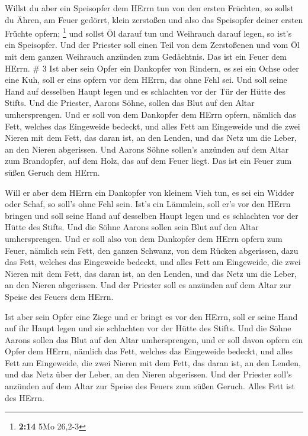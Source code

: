  Willst du aber ein Speisopfer dem HErrn tun von den ersten
Früchten, so sollst du Ähren, am Feuer gedörrt, klein zerstoßen und also
das Speisopfer deiner ersten Früchte opfern; \footnote{\textbf{2:14} 5Mo
  26,2-3}  und sollst Öl darauf tun und Weihrauch darauf
legen, so ist's ein Speisopfer.  Und der Priester soll
einen Teil von dem Zerstoßenen und vom Öl mit dem ganzen Weihrauch
anzünden zum Gedächtnis. Das ist ein Feuer dem HErrn. \# 3 
Ist aber sein Opfer ein Dankopfer von Rindern, es sei ein Ochse oder
eine Kuh, soll er eins opfern vor dem HErrn, das ohne Fehl sei.
 Und soll seine Hand auf desselben Haupt legen und es
schlachten vor der Tür der Hütte des Stifts. Und die Priester, Aarons
Söhne, sollen das Blut auf den Altar umhersprengen.  Und er
soll von dem Dankopfer dem HErrn opfern, nämlich das Fett, welches das
Eingeweide bedeckt, und alles Fett am Eingeweide  und die
zwei Nieren mit dem Fett, das daran ist, an den Lenden, und das Netz um
die Leber, an den Nieren abgerissen.  Und Aarons Söhne
sollen's anzünden auf dem Altar zum Brandopfer, auf dem Holz, das auf
dem Feuer liegt. Das ist ein Feuer zum süßen Geruch dem HErrn.

 Will er aber dem HErrn ein Dankopfer von kleinem Vieh tun,
es sei ein Widder oder Schaf, so soll's ohne Fehl sein. 
Ist's ein Lämmlein, soll er's vor den HErrn bringen  und
soll seine Hand auf desselben Haupt legen und es schlachten vor der
Hütte des Stifts. Und die Söhne Aarons sollen sein Blut auf den Altar
umhersprengen.  Und er soll also von dem Dankopfer dem HErrn
opfern zum Feuer, nämlich sein Fett, den ganzen Schwanz, von dem Rücken
abgerissen, dazu das Fett, welches das Eingeweide bedeckt, und alles
Fett am Eingeweide,  die zwei Nieren mit dem Fett, das
daran ist, an den Lenden, und das Netz um die Leber, an den Nieren
abgerissen.  Und der Priester soll es anzünden auf dem
Altar zur Speise des Feuers dem HErrn.

 Ist aber sein Opfer eine Ziege und er bringt es vor den
HErrn,  soll er seine Hand auf ihr Haupt legen und sie
schlachten vor der Hütte des Stifts. Und die Söhne Aarons sollen das
Blut auf den Altar umhersprengen,  und er soll davon opfern
ein Opfer dem HErrn, nämlich das Fett, welches das Eingeweide bedeckt,
und alles Fett am Eingeweide,  die zwei Nieren mit dem
Fett, das daran ist, an den Lenden, und das Netz über der Leber, an den
Nieren abgerissen.  Und der Priester soll's anzünden auf
dem Altar zur Speise des Feuers zum süßen Geruch. Alles Fett ist des
HErrn.

